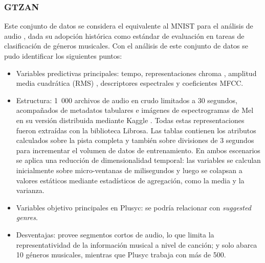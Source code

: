 \subsubsection{GTZAN}
Este conjunto de datos se considera el equivalente al MNIST \cite{lecun1998gradient} para el análisis de audio \cite{sturm2014state}, dada su adopción histórica como estándar de evaluación en tareas de clasificación de géneros musicales. Con el análisis de este conjunto de datos se pudo identificar los siguientes puntos:
\begin{itemize}
    \item Variables predictivas principales: tempo, representaciones chroma \citep{gomez2006tonal}, amplitud media cuadrática (RMS) \citep{lerch2012introduction}, descriptores espectrales \citep{peeters2004large} y coeficientes MFCC.
    \item Estructura: 1~000 archivos de audio en crudo limitados a 30 segundos, acompañados de metadatos tabulares e imágenes de espectrogramas de Mel en su versión distribuida mediante Kaggle \citep{gtzan_kaggle}. 
    Todas estas representaciones fueron extraídas con la biblioteca Librosa. Las tablas contienen los atributos calculados sobre la pista completa y también sobre divisiones de 3 segundos para incrementar el volumen de datos de entrenamiento. En ambos escenarios se aplica una reducción de dimensionalidad temporal: las variables se calculan inicialmente sobre micro-ventanas de milisegundos y luego se colapsan a valores estáticos mediante estadísticos de agregación, como la media y la varianza.
    \item Variables objetivo principales en Plusyc: se podría relacionar con \textit{suggested genres}. 
    \item Desventajas: provee segmentos cortos de audio, lo que limita la representatividad de la información musical a nivel de canción; y solo abarca 10 géneros musicales, mientras que Plusyc trabaja con más de 500.
\end{itemize}

